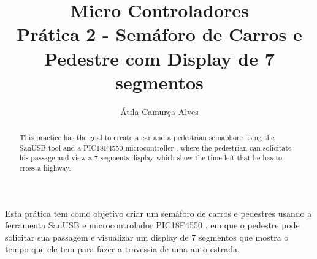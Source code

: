 \documentclass[12pt]{article}
\title{Micro Controladores\\Prática 2 - Semáforo de Carros e Pedestre com Display de 7 segmentos}
\author{Átila Camurça Alves}
\begin{document}
\maketitle

\begin{abstract}
  This practice has the goal to create a car and a pedestrian semaphore
  using the SanUSB tool \cite{sanusb-mplabx:11} and a PIC18F4550 microcontroller
  \cite{microchip-pic18f4550}, where the pedestrian can solicitate his passage
  and view a 7 segments display which show the time left that he has to cross
  a highway.
\end{abstract}
     
\begin{resumo}
  Esta prática tem como objetivo criar um semáforo de carros e pedestres usando
  a ferramenta SanUSB \cite{sanusb-mplabx:11} e microcontrolador
  PIC18F4550 \cite{microchip-pic18f4550}, em que o pedestre pode solicitar sua
  passagem e visualizar um display de 7 segmentos que mostra
  o tempo que ele tem para fazer a travessia de uma auto estrada.
\end{resumo}

\renewcommand\listoflistingscaption{Lista de códigos fonte}
\listoflistings






\appendix


\end{document}
